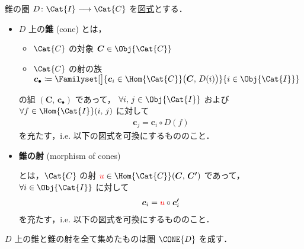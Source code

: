 \documentclass[TQFT_main]{subfiles}
\begin{document}
\begin{mydef}[label=def:Cone, breakable]{錐の圏}
	$D \colon \Cat{I} \lto \Cat{C}$ を\hyperref[def:diagram]{図式}とする．
	\begin{itemize}
		\item $D$ 上の\textbf{錐} (cone) とは，
		\begin{itemize}
			\item $\Cat{C}$ の対象 $\bm{C} \in \Obj{\Cat{C}}$
			\item $\Cat{C}$ の射の族 $\bm{c}_\bullet \coloneqq \Familyset[\big]{\bm{c}_i \in \Hom{\Cat{C}}\bigl(\bm{C},\, D(i)\bigr)}{i \in \Obj{\Cat{I}}}$
		\end{itemize}
		の組 $(\bm{C},\, \bm{c}_\bullet)$ であって，
		$\forall i,\, j \in \Obj{\Cat{I}}$ および $\forall f \in \Hom{\Cat{I}}(i,\, j)$ に対して
		\begin{align}
			\bm{c}_j = \bm{c}_i \circ D(f)
		\end{align}
		を充たす，i.e. 以下の図式を可換にするもののこと．
		\begin{center}
		\end{center}
		\item \textbf{錐の射} (morphism of cones) 
		\begin{center}
		\end{center}
		とは，$\Cat{C}$ の射 $\textcolor{red}{u} \in \Hom{\Cat{C}} (\bm{C},\, \bm{C'})$ であって，$\forall i \in \Obj{\Cat{I}}$ に対して
		\begin{align}
			\bm{c}_i = \textcolor{red}{u} \circ \bm{c'}_i
		\end{align}
		を充たす，i.e. 以下の図式を可換にするもののこと．
		\begin{center}
		\end{center}
	\end{itemize}
	$D$ 上の錐と錐の射を全て集めたものは圏 $\CONE{D}$ を成す．
\end{mydef}
\end{document}
